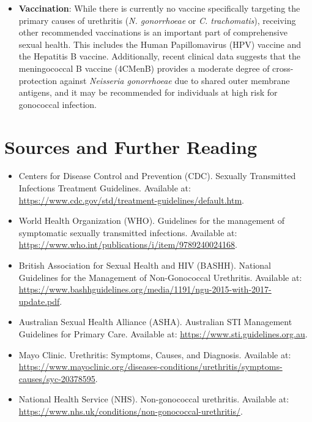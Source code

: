 \begin{itemize}
    \item \textbf{Vaccination}: While there is currently no vaccine specifically targeting the primary causes of urethritis (\textit{N. gonorrhoeae} or \textit{C. trachomatis}), receiving other recommended vaccinations is an important part of comprehensive sexual health. This includes the Human Papillomavirus (HPV) vaccine and the Hepatitis B vaccine. Additionally, recent clinical data suggests that the meningococcal B vaccine (4CMenB) provides a moderate degree of cross-protection against \textit{Neisseria gonorrhoeae} due to shared outer membrane antigens, and it may be recommended for individuals at high risk for gonococcal infection.
\end{itemize}

\section*{Sources and Further Reading}
\begin{itemize}
    \item Centers for Disease Control and Prevention (CDC). Sexually Transmitted Infections Treatment Guidelines. Available at: \url{https://www.cdc.gov/std/treatment-guidelines/default.htm}.

    \item World Health Organization (WHO). Guidelines for the management of symptomatic sexually transmitted infections. Available at: \url{https://www.who.int/publications/i/item/9789240024168}.

    \item British Association for Sexual Health and HIV (BASHH). National Guidelines for the Management of Non-Gonococcal Urethritis. Available at: \url{https://www.bashhguidelines.org/media/1191/ngu-2015-with-2017-update.pdf}.

    \item Australian Sexual Health Alliance (ASHA). Australian STI Management Guidelines for Primary Care. Available at: \url{https://www.sti.guidelines.org.au}.

    \item Mayo Clinic. Urethritis: Symptoms, Causes, and Diagnosis. Available at: \url{https://www.mayoclinic.org/diseases-conditions/urethritis/symptoms-causes/syc-20378595}.

    \item National Health Service (NHS). Non-gonococcal urethritis. Available at: \url{https://www.nhs.uk/conditions/non-gonococcal-urethritis/}.
\end{itemize}